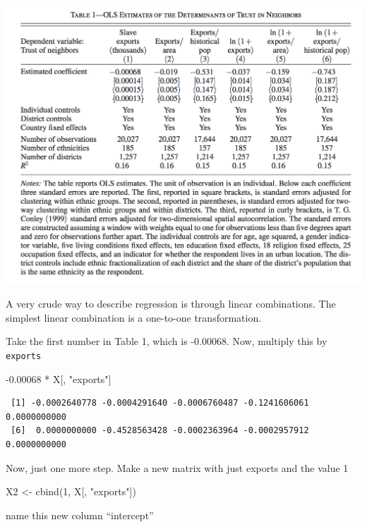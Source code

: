 \documentclass[
  letterpaper,
]{book}
\newenvironment{Shaded}{\begin{snugshade}}{\end{snugshade}}
\newcommand{\DecValTok}[1]{\textcolor[rgb]{0.68,0.00,0.00}{#1}}
\newcommand{\FloatTok}[1]{\textcolor[rgb]{0.68,0.00,0.00}{#1}}
\newcommand{\FunctionTok}[1]{\textcolor[rgb]{0.28,0.35,0.67}{#1}}
\newcommand{\NormalTok}[1]{\textcolor[rgb]{0.00,0.23,0.31}{#1}}
\newcommand{\OtherTok}[1]{\textcolor[rgb]{0.00,0.23,0.31}{#1}}
\newcommand{\SpecialCharTok}[1]{\textcolor[rgb]{0.37,0.37,0.37}{#1}}
\newcommand{\StringTok}[1]{\textcolor[rgb]{0.13,0.47,0.30}{#1}}
\theoremstyle{definition}
\theoremstyle{definition}
\theoremstyle{plain}
\theoremstyle{definition}
\theoremstyle{plain}
\theoremstyle{plain}
\theoremstyle{remark}
\begin{document}
\includegraphics{./images/nunn_wantchekon_table1.png}

A very crude way to describe regression is through linear combinations.
The simplest linear combination is a one-to-one transformation.

Take the first number in Table 1, which is -0.00068. Now, multiply this
by \texttt{exports}

\begin{Shaded}
\begin{Highlighting}[]
\SpecialCharTok{{-}}\FloatTok{0.00068} \SpecialCharTok{*}\NormalTok{ X[, }\StringTok{"exports"}\NormalTok{]}
\end{Highlighting}
\end{Shaded}

\begin{verbatim}
 [1] -0.0002640778 -0.0004291640 -0.0006760487 -0.1241606061  0.0000000000
 [6]  0.0000000000 -0.4528563428 -0.0002363964 -0.0002957912  0.0000000000
\end{verbatim}

Now, just one more step. Make a new matrix with just exports and the
value 1

\begin{Shaded}
\begin{Highlighting}[]
\NormalTok{X2 }\OtherTok{\textless{}{-}} \FunctionTok{cbind}\NormalTok{(}\DecValTok{1}\NormalTok{, X[, }\StringTok{"exports"}\NormalTok{])}
\end{Highlighting}
\end{Shaded}

name this new column ``intercept''
\end{document}
